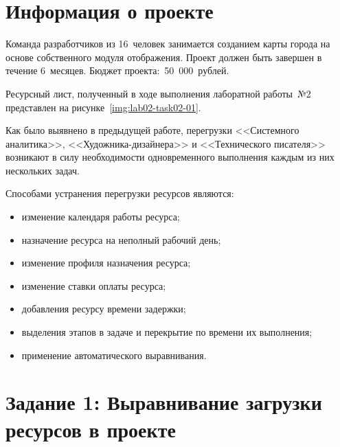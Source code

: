\section{Информация о проекте}

Команда разработчиков из 16~человек занимается созданием карты города на основе
собственного модуля отображения. Проект должен быть завершен в течение
6~месяцев. Бюджет проекта:~50~000~рублей.

Ресурсный лист, полученный в ходе выполнения лаборатной работы~№2 представлен на
рисунке~\ref{img:lab02-task02-01}.


Как было выявнено в предыдущей работе, перегрузки <<Системного аналитика>>,
<<Художника-дизайнера>> и <<Технического писателя>> возникают в силу
необходимости одновременного выполнения каждым из них нескольких задач.

Способами устранения перегрузки ресурсов являются:
\begin{itemize}
    \item изменение календаря работы ресурса;
    \item назначение ресурса на неполный рабочий день;
    \item изменение профиля назначения ресурса;
    \item изменение ставки оплаты ресурса;
    \item добавления ресурсу времени задержки;
    \item выделения этапов в задаче и перекрытие по времени их выполнения;
    \item применение автоматического выравнивания.
\end{itemize}

\section{Задание 1: Выравнивание загрузки ресурсов в проекте}

